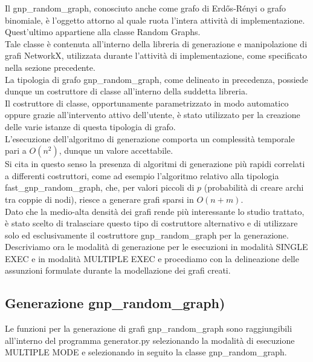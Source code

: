 Il gnp\_random\_graph, conosciuto anche come grafo di Erdős-Rényi o grafo binomiale, è l'oggetto attorno al quale ruota l'intera attività di implementazione.\\ Quest'ultimo appartiene alla classe Random Graphs.\\
Tale classe è contenuta all'interno della libreria di generazione e manipolazione di grafi NetworkX, utilizzata durante l'attività di implementazione, come specificato nella sezione precedente.\\
La tipologia di grafo gnp\_random\_graph, come delineato in precedenza, possiede dunque un costruttore di classe all'interno della suddetta libreria.\\

Il costruttore di classe, opportunamente parametrizzato in modo automatico oppure grazie all'intervento attivo dell'utente, è stato utilizzato per la creazione delle varie istanze di questa tipologia di grafo.\\

L'esecuzione dell'algoritmo di generazione comporta un complessità temporale pari a \(O(n^2)\), dunque un valore accettabile.\\
Si cita in questo senso la presenza di algoritmi di generazione più rapidi correlati a differenti costruttori, come ad esempio l'algoritmo relativo alla tipologia fast\_gnp\_random\_graph, che, per valori piccoli di $p$ (probabilità di creare archi tra coppie di nodi), riesce a generare grafi sparsi in \(O(n+m)\).\\

Dato che la medio-alta densità dei grafi rende più interessante lo studio trattato, è stato scelto di tralasciare questo tipo di costruttore alternativo e di utilizzare solo ed esclusivamente il costruttore gnp\_random\_graph per la generazione.\\

Descriviamo ora le modalità di generazione per le esecuzioni in modalità SINGLE EXEC e in modalità MULTIPLE EXEC e procediamo con la delineazione delle assunzioni formulate durante la modellazione dei grafi creati.\\

\subsection{Generazione gnp\_random\_graph)}
\justify
Le funzioni per la generazione di grafi gnp\_random\_graph sono raggiungibili all'interno del programma generator.py selezionando la modalità di esecuzione MULTIPLE MODE e selezionando in seguito la classe gnp\_random\_graph.\\

